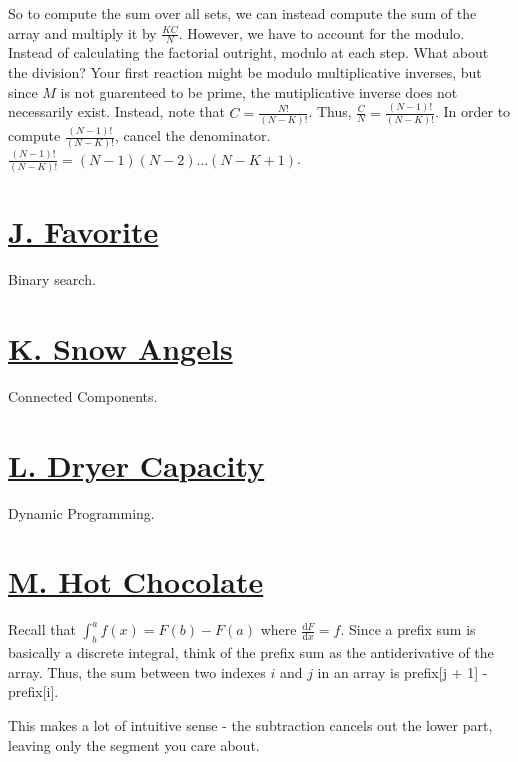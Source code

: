 \documentclass[11pt, oneside]{article}
\begin{document}
So to compute the sum over all sets, we can instead compute the sum of the array
and multiply it by \( \frac{KC}{N} \). However, we have to account for the modulo.
Instead of calculating the factorial outright, modulo at each step. What about the division? Your first reaction might be modulo multiplicative inverses, but since \( M \) is not guarenteed to be prime, the mutiplicative inverse does not necessarily exist.
Instead, note that \( C = \frac{N!}{(N - K)!} \). Thus, \( \frac{C}{N} = \frac{(N - 1)!}{(N - K)!} \). In order to compute \( \frac{(N - 1)!}{(N - K)!} \), cancel the denominator. \( \frac{(N - 1)!}{(N - K)!} = (N - 1)(N - 2) ... (N - K + 1) \).

\section{\href{https://codeforces.com/group/XaPbwwWypc/contest/275182/problem/J}{J. Favorite}}

Binary search.

\section{\href{https://codeforces.com/group/XaPbwwWypc/contest/275182/problem/K}{K. Snow Angels}}

Connected Components.

\section{\href{https://codeforces.com/group/XaPbwwWypc/contest/275182/problem/L}{L. Dryer Capacity}}

Dynamic Programming.

\newpage

\section{\href{https://codeforces.com/group/XaPbwwWypc/contest/275182/problem/M}{M. Hot Chocolate}}

Recall that \( \int^a_b f(x) = F(b) - F(a) \) where \( \frac{\mathrm{ d}F}{\mathrm{ d}x} = f \). Since a prefix sum is basically a discrete integral, think of the prefix sum as the antiderivative of the array. Thus, the sum between two indexes \( i \) and
\( j \) in an array is prefix[j + 1] - prefix[i].

This makes a lot of intuitive sense - the subtraction cancels out the lower part,
leaving only the segment you care about.
\end{document}
